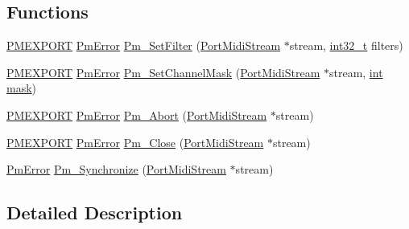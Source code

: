 \subsection*{Functions}
\begin{DoxyCompactItemize}
\item 
\hyperlink{porttime_8h_ad478fb637833fb6b1a4bdb25a03f4662}{P\+M\+E\+X\+P\+O\+RT} \hyperlink{portmidi_8h_a5fd46ccd2e320e17a840886731e8c6b9}{Pm\+Error} \hyperlink{group__grp__events__filters_ga1a2b69b85efe9743345e18fc96607994}{Pm\+\_\+\+Set\+Filter} (\hyperlink{portmidi_8h_af4949219ee1bb0afc857cb242d123914}{Port\+Midi\+Stream} $\ast$stream, \hyperlink{lib-src_2ffmpeg_2win32_2stdint_8h_a37994e3b11c72957c6f454c6ec96d43d}{int32\+\_\+t} filters)
\item 
\hyperlink{porttime_8h_ad478fb637833fb6b1a4bdb25a03f4662}{P\+M\+E\+X\+P\+O\+RT} \hyperlink{portmidi_8h_a5fd46ccd2e320e17a840886731e8c6b9}{Pm\+Error} \hyperlink{group__grp__events__filters_ga87f9bc67a21a8b058a3f915a2f98746a}{Pm\+\_\+\+Set\+Channel\+Mask} (\hyperlink{portmidi_8h_af4949219ee1bb0afc857cb242d123914}{Port\+Midi\+Stream} $\ast$stream, \hyperlink{xmltok_8h_a5a0d4a5641ce434f1d23533f2b2e6653}{int} \hyperlink{structmask}{mask})
\item 
\hyperlink{porttime_8h_ad478fb637833fb6b1a4bdb25a03f4662}{P\+M\+E\+X\+P\+O\+RT} \hyperlink{portmidi_8h_a5fd46ccd2e320e17a840886731e8c6b9}{Pm\+Error} \hyperlink{group__grp__events__filters_ga8934ac3b02359b60177a06580c66a20e}{Pm\+\_\+\+Abort} (\hyperlink{portmidi_8h_af4949219ee1bb0afc857cb242d123914}{Port\+Midi\+Stream} $\ast$stream)
\item 
\hyperlink{porttime_8h_ad478fb637833fb6b1a4bdb25a03f4662}{P\+M\+E\+X\+P\+O\+RT} \hyperlink{portmidi_8h_a5fd46ccd2e320e17a840886731e8c6b9}{Pm\+Error} \hyperlink{group__grp__events__filters_ga6b26be2fbcf092c9625ade5303edd0ac}{Pm\+\_\+\+Close} (\hyperlink{portmidi_8h_af4949219ee1bb0afc857cb242d123914}{Port\+Midi\+Stream} $\ast$stream)
\item 
\hyperlink{portmidi_8h_a5fd46ccd2e320e17a840886731e8c6b9}{Pm\+Error} \hyperlink{group__grp__events__filters_gada0edc37a3424b086b14b151be3aea1a}{Pm\+\_\+\+Synchronize} (\hyperlink{portmidi_8h_af4949219ee1bb0afc857cb242d123914}{Port\+Midi\+Stream} $\ast$stream)
\end{DoxyCompactItemize}


\subsection{Detailed Description}


